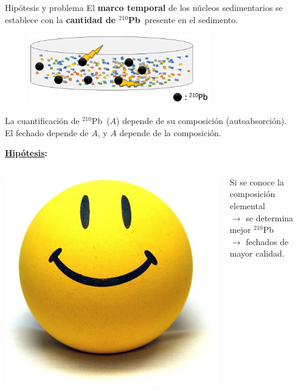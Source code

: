\documentclass[9pt]{beamer}
\newcommand{\PbCero}{$^{210}$Pb}
\begin{document}
\begin{frame}{Hipótesis y problema}
\justifying El \textbf{marco temporal} de los núcleos sedimentarios se establece con la \textbf{cantidad de \PbCero\,} presente en el sedimento.
\begin{figure}
\centering
\includegraphics[width=0.7\textwidth]{Imagenes/Seccion_y_210Pb-2.png}
\end{figure}
\begin{center}
La cuantificación de \PbCero\, ($A$) depende de su composición (autoabsorción).
\\ \vspace{0.5cm}
El fechado depende de $A$, y $A$ depende de la composición.
\end{center}
\textbf{\underline{Hipótesis}:}\\
\begin{columns}
\begin{column}{0.1\textwidth}
\includegraphics[scale=0.1]{Imagenes/CaritaFeliz.jpg}
		\end{column}
		\begin{column}{0.9\textwidth}  %
Si se conoce la composición elemental
\\
\hspace{3cm}$\rightarrow$\hspace{0.2cm} se determina mejor \PbCero
\\
\hspace{6cm}$\rightarrow$\hspace{0.2cm} fechados de mayor calidad.  
		\end{column}


\end{columns}
\end{frame}
\end{document}
